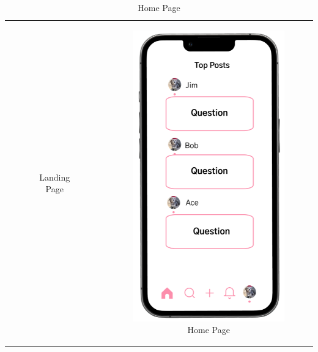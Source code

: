 \begin{longtable}{@{}cc@{}}
\begin{subfigure}{.5\textwidth}
        \caption{\footnotesize Landing Page}
        \label{fig:landing}
    \end{subfigure}%
    &
    \begin{subfigure}{.5\textwidth}
        \centering
        \includegraphics[width=.8\linewidth]{Figures/home.png}
        \caption{\footnotesize Home Page}
        \label{fig:home}
    \end{subfigure} \\
    

\end{longtable}
